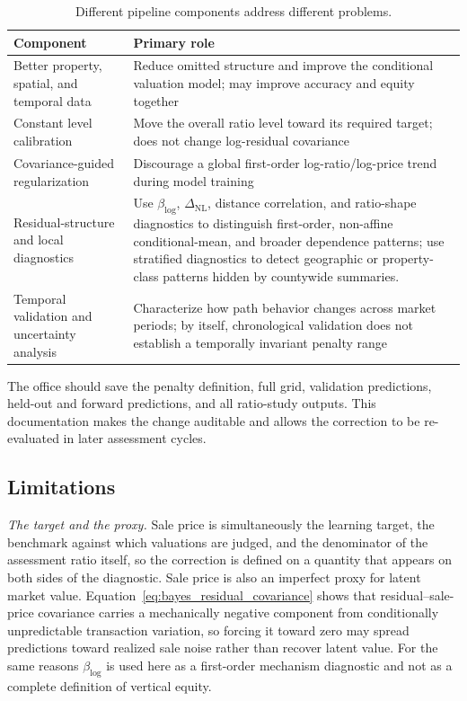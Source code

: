 \documentclass[10pt]{article}
\theoremstyle{definition}
\newcommand{\1}{\mathbf{1}}
\begin{document}
\begin{table}[t]
\centering
\caption{Different pipeline components address different problems.}
\label{tab:roles}
\begin{tabular}{p{4.2cm}p{10.0cm}}
\toprule
Component & Primary role \\
\midrule
Better property, spatial, and temporal data & Reduce omitted structure and improve the conditional valuation model; may improve accuracy and equity together \\
Constant level calibration & Move the overall ratio level toward its required target; does not change log-residual covariance \\
Covariance-guided regularization & Discourage a global first-order log-ratio/log-price trend during model training \\
Residual-structure and local diagnostics & Use $\beta_{\log}$, $\Delta_{\mathrm{NL}}$, distance correlation, and ratio-shape diagnostics to distinguish first-order, non-affine conditional-mean, and broader dependence patterns; use stratified diagnostics to detect geographic or property-class patterns hidden by countywide summaries. \\
Temporal validation and uncertainty analysis & Characterize how path behavior changes across market periods; by itself, chronological validation does not establish a temporally invariant penalty range \\
\bottomrule
\end{tabular}
\end{table}

The office should save the penalty definition, full grid, validation predictions, held-out and forward predictions, and all ratio-study outputs. This documentation makes the change auditable and allows the correction to be re-evaluated in later assessment cycles.

\subsection{Limitations}


\emph{The target and the proxy.} Sale price is simultaneously the learning target, the
benchmark against which valuations are judged, and the denominator of the assessment ratio itself,
so the correction is defined on a quantity that appears on both sides of the diagnostic. Sale price
is also an imperfect proxy for latent market value. Equation~\eqref{eq:bayes_residual_covariance}
shows that residual--sale-price covariance carries a mechanically negative component from
conditionally unpredictable transaction variation, so forcing it toward zero may spread predictions
toward realized sale noise rather than recover latent value. For the same reasons $\beta_{\log}$ is
used here as a first-order mechanism diagnostic and not as a complete definition of vertical
equity.
\end{document}
